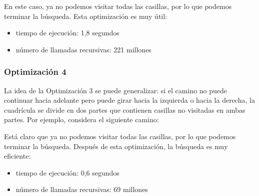 \begin{center}
\end{center}
En este caso, ya no podemos visitar todas las casillas,
por lo que podemos terminar la búsqueda.
Esta optimización es muy útil:

\begin{itemize}[itemsep=0em,topsep=0.5em]
  \item tiempo de ejecución: 1,8 segundos
  \item número de llamadas recursivas: 221 millones
\end{itemize}

\subsubsection{Optimización 4}

La idea de la Optimización 3
se puede generalizar:
si el camino no puede continuar hacia adelante
pero puede girar hacia la izquierda o hacia la derecha,
la cuadrícula se divide en dos partes
que contienen casillas no visitadas en ambas partes.
Por ejemplo, considera el siguiente camino:

\begin{center}
\end{center}
Está claro que ya no podemos visitar todas las casillas,
por lo que podemos terminar la búsqueda.
Después de esta optimización, la búsqueda es
muy eficiente:

\begin{itemize}[itemsep=0em,topsep=0.5em]
  \item tiempo de ejecución: 0,6 segundos
  \item número de llamadas recursivas: 69 millones
\end{itemize}

